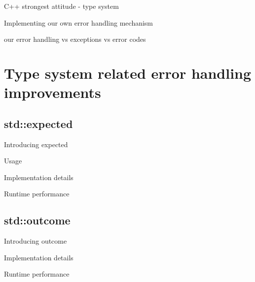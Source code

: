\documentclass[10pt,a4paper]{beamer}
\begin{document}
\begin{frame}{C++ strongest attitude - type system}
\end{frame}

\begin{frame}{Implementing our own error handling mechanism}
\end{frame}
	
\begin{frame}{our error handling vs exceptions vs error codes}
\end{frame}
	
\section{Type system related error handling improvements}

\subsection{std::expected}
\begin{frame}{Introducing expected}
\end{frame}

\begin{frame}{Usage}
\end{frame}

\begin{frame}{Implementation details}
\end{frame}

\begin{frame}{Runtime performance}
\end{frame}

\subsection{std::outcome}

\begin{frame}{Introducing outcome}
\end{frame}

\begin{frame}{Implementation details}
\end{frame}

\begin{frame}{Runtime performance}
\end{frame}
\end{document}
